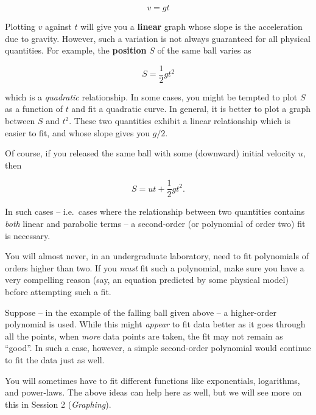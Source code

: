 \begin{equation*}
    v = g t
\end{equation*}

Plotting $v$ against $t$ will give you a \textbf{linear} graph whose slope is the acceleration due to gravity. However, such a variation is not always guaranteed for all physical quantities. For example, the \textbf{position} $S$ of the same ball varies as

\begin{equation*}
    S = \frac{1}{2} g t^2
\end{equation*}

which is a \textit{quadratic} relationship. In some cases, you might be tempted to plot $S$ as a function of $t$ and fit a quadratic curve. In general, it is better to plot a graph between $S$ and $t^2$. These two quantities exhibit a linear relationship which is easier to fit, and whose slope gives you $g/2$.

Of course, if you released the same ball with some (downward) initial velocity $u$, then 

\begin{equation*}
    S = u t + \frac{1}{2} g t^2.
\end{equation*}

In such cases -- i.e.\ cases where the relationship between two quantities contains \textit{both} linear and parabolic terms -- a second-order (or polynomial of order two) fit is necessary. 

\begin{tip}
You will almost never, in an undergraduate laboratory, need to fit polynomials of orders higher than two. If you \textit{must} fit such a polynomial, make sure you have a very compelling reason (say, an equation predicted by some physical model) before attempting such a fit. 

Suppose -- in the example of the falling ball given above -- a higher-order polynomial is used. While this might \textit{appear} to fit data better as it goes through all the points, when \textit{more} data points are taken, the fit may not remain as ``good''. In such a case, however, a simple second-order polynomial would continue to fit the data just as well.
\end{tip}


You will sometimes have to fit different functions like exponentials, logarithms, and power-laws. The above ideas can help here as well, but we will see more on this in Session 2 (\textit{Graphing}).




